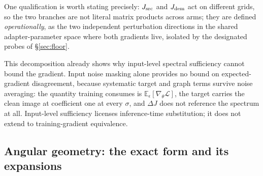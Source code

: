 One qualification is worth stating precisely: $J_{\mathrm{src}}$ and
$J_{\mathrm{dem}}$ act on different grids, so the two branches are not literal
matrix products across arms; they are defined \emph{operationally}, as
the two independent perturbation directions in the shared
adapter-parameter space where both gradients live, isolated by the
designated probes of \S\ref{sec:floor}.

This decomposition already shows why input-level spectral sufficiency
cannot bound the gradient. Input noise masking alone provides no bound
on expected-gradient disagreement, because systematic target and graph
terms survive noise averaging: the quantity training consumes is
$\mathbb{E}_\epsilon[\nabla_\theta \mathcal{L}]$, the target carries the
clean image at coefficient one at every $\sigma$, and $\Delta J$ does
not reference the spectrum at all. Input-level sufficiency licenses
inference-time substitution; it does not extend to training-gradient
equivalence.

\subsection{Angular geometry: the exact form and its expansions}
\label{sec:geometry}

